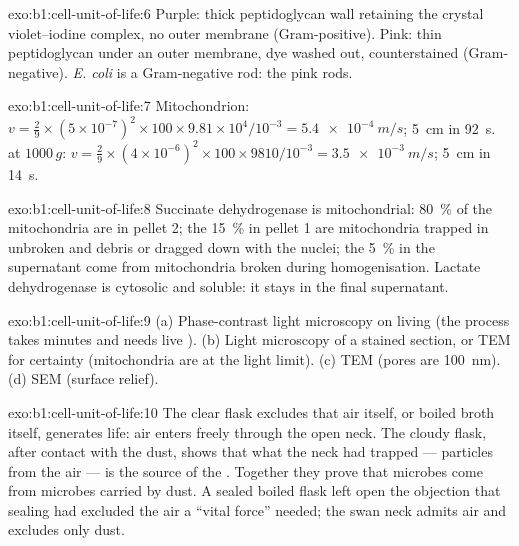 \begin{solution}{exo:b1:cell-unit-of-life:6}
Purple: thick peptidoglycan wall retaining the crystal violet--iodine
complex, no outer membrane (Gram-positive). Pink: thin peptidoglycan
under an outer membrane, dye washed out, counterstained (Gram-negative).
\emph{E. coli} is a Gram-negative rod: the pink rods.
\end{solution}

\begin{solution}{exo:b1:cell-unit-of-life:7}
Mitochondrion: $v = \frac{2}{9}\times(5\times 10^{-7})^2\times 100\times
9.81\times 10^4/10^{-3} = \qty{5.4e-4}{m/s}$; \qty{5}{cm} in
\qty{92}{s}.  at $1000\,g$: $v = \frac{2}{9}\times(4\times
10^{-6})^2\times 100\times 9810/10^{-3} = \qty{3.5e-3}{m/s}$; \qty{5}{cm}
in \qty{14}{s}.
\end{solution}

\begin{solution}{exo:b1:cell-unit-of-life:8}
Succinate dehydrogenase is mitochondrial: \qty{80}{\%} of the
mitochondria are in pellet 2; the \qty{15}{\%} in pellet 1 are
mitochondria trapped in unbroken  and debris or dragged down with
the nuclei; the \qty{5}{\%} in the supernatant come from mitochondria
broken during homogenisation. Lactate dehydrogenase is cytosolic and
soluble: it stays in the final supernatant.
\end{solution}

\begin{solution}{exo:b1:cell-unit-of-life:9}
(a) Phase-contrast light microscopy on living  (the process
takes minutes and needs live ). (b) Light microscopy of a
stained section, or TEM for certainty (mitochondria are at the light
limit). (c) TEM (pores are \qty{100}{nm}). (d) SEM (surface relief).
\end{solution}

\begin{solution}{exo:b1:cell-unit-of-life:10}
The clear flask excludes that air itself, or boiled broth itself,
generates life: air enters freely through the open neck. The cloudy
flask, after contact with the dust, shows that what the neck had
trapped --- particles from the air --- is the source of the .
Together they prove that microbes come from microbes carried by dust.
A sealed boiled flask left open the objection that sealing had excluded
the air a ``vital force'' needed; the swan neck admits air and excludes
only dust.
\end{solution}


